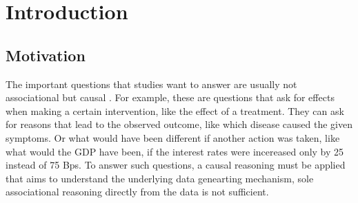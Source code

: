 




\chapter{Introduction}

\section{Motivation}


The important questions that studies want to answer are usually not associational but causal \citep{pearl2009}. For example, these are questions that ask for effects when making a certain intervention, like the effect of a treatment. They can ask for reasons that lead to the observed outcome, like which disease caused the given symptoms. Or what would have been different if another action was taken, like what would the GDP have been, if the interest rates were incereased only by 25 instead of 75 Bps. To answer such questions, a causal reasoning must be applied that aims to understand the underlying data genearting mechanism, sole associational reasoning directly from the data is not sufficient. 




